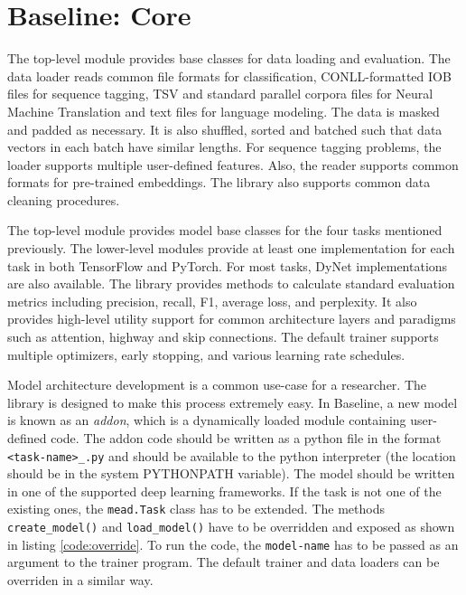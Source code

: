\documentclass[11pt,a4paper]{article}
\begin{document}
\section{Baseline: Core}
\label{sec:baseline}

The top-level module provides base classes for data loading and evaluation. The data loader reads common file formats for classification, CONLL-formatted IOB files for sequence tagging, TSV and standard parallel corpora files for Neural Machine Translation and text files for language modeling. The data is masked and padded as necessary. It is also shuffled, sorted and batched such that data vectors in each batch have similar lengths. For sequence tagging problems, the loader supports multiple user-defined features. Also, the reader supports common formats for pre-trained embeddings. The library also supports common data cleaning procedures.

The top-level module provides model base classes for the four tasks mentioned previously. The lower-level modules provide at least one implementation for each task in both TensorFlow and PyTorch. For most tasks, DyNet implementations are also available. The library provides methods to calculate standard evaluation metrics including precision, recall, F1, average loss, and perplexity. It also provides high-level utility support for common architecture layers and paradigms such as attention, highway and skip connections. The default trainer supports multiple optimizers, early stopping, and various learning rate schedules.

Model architecture development is a common use-case for a researcher. The library is designed to make this process extremely easy. In Baseline, a new model is known as an \textit{addon}, which is a dynamically loaded module containing user-defined code. The addon code should be written as a python file in the format \texttt{<task-name>\_<model-name>.py} and should be available to the python interpreter (the location should be in the system PYTHONPATH variable). The model should be written in one of the supported deep learning frameworks. If the task is not one of the existing ones, the \texttt{mead.Task} class has to be extended. The methods \texttt{create\_model()} and \texttt{load\_model()} have to be overridden and exposed as shown in listing \ref{code:override}. To run the code, the \texttt{model-name} has to be passed as an argument to the trainer program. The default trainer and data loaders can be overriden in a similar way.  


\end{document}
